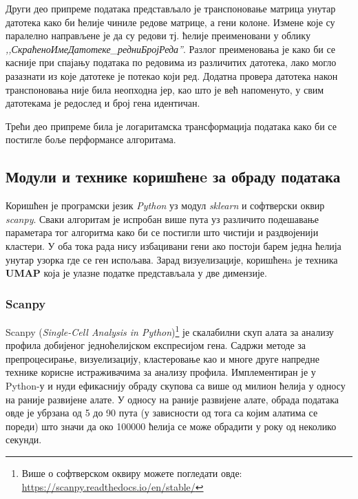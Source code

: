 \documentclass[10pt, a4paper]{article}
\begin{document}
Други део припреме података представљало је транспоновање матрица унутар датотека како би ћелије чиниле редове матрице, а гени колоне. Измене које су паралелно направљене је да су редови тј. ћелије преименовани у облику {\em,,СкраћеноИмеДатотеке\_редниБројРеда''}. Разлог преименовања је како би се касније при спајању података по редовима из различитих датотека, лако могло разазнати из које датотеке је потекао који ред. Додатна провера датотека након транспоновања није била неопходна јер, као што је већ напоменуто, у свим датотекама је редослед и број гена идентичан.

Трећи део припреме била је логаритамска трансформација података како би се постигле боље перформансе алгоритама.

\subsection{Модули и технике коришћенe за обраду података}
\label{subsec: podnaslov3}

Коришћен је програмски језик {\em Python} уз модул {\em sklearn} и софтверски оквир {\em scanpy}. Сваки алгоритам је испробан више пута уз различито подешавање параметара тог алгоритма како би се постигли што чистији и раздвојенији кластери. У оба тока рада нису избацивани гени ако постоји барем једна ћелија унутар узорка где се ген испољава. Зарад визуелизације, коришћенa је техника \textbf{UMAP} која је улазне податке представљала у две димензије.

\subsubsection{Scanpy}
\label{subsec: podpodnaslov1}

Scanpy ({\em Single-Cell Analysis in Python})\footnote{Више о софтверском оквиру можете погледати овде: \url{https://scanpy.readthedocs.io/en/stable/}} је скалабилни скуп алата за анализу профила добијеног једноћелијском експресијом гена. \cite{scanpy} Садржи методе за препроцесирање, визуелизацију, кластеровање као и многе друге напредне технике корисне истраживачима за анализу профила. Имплементиран је у Python-у и нуди ефикаснију обраду скупова са више од милион ћелија у односу на раније развијене алате. У односу на раније развијене алате, обрада података овде је убрзана од 5 до 90 пута (у зависности од тога са којим алатима се пореди) што значи да око 100000 ћелија се може обрадити у року од неколико секунди.
\end{document}
